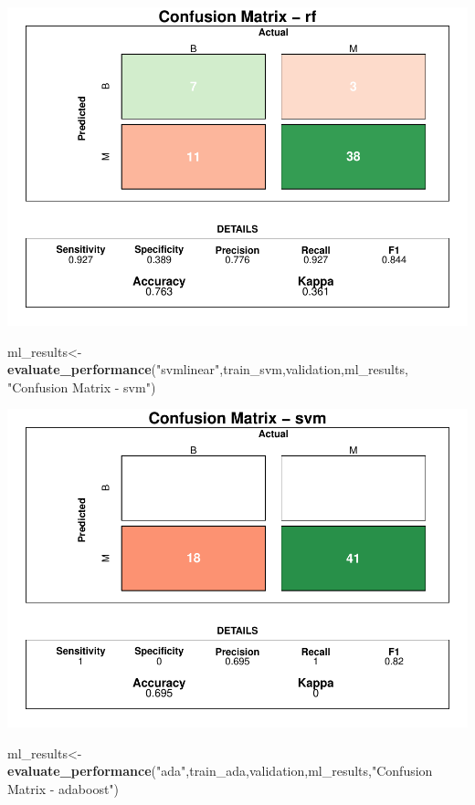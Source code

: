 \documentclass[]{article}
\newenvironment{Shaded}{\begin{snugshade}}{\end{snugshade}}
\newcommand{\KeywordTok}[1]{\textcolor[rgb]{0.13,0.29,0.53}{\textbf{#1}}}
\newcommand{\NormalTok}[1]{#1}
\newcommand{\StringTok}[1]{\textcolor[rgb]{0.31,0.60,0.02}{#1}}
\begin{document}
\includegraphics{LiverDisease_files/figure-latex/unnamed-chunk-45-1.pdf}

\begin{Shaded}
\begin{Highlighting}[]
\NormalTok{ml_results<-}\KeywordTok{evaluate_performance}\NormalTok{(}\StringTok{"svmlinear"}\NormalTok{,train_svm,validation,ml_results, }\StringTok{"Confusion Matrix - svm"}\NormalTok{)}
\end{Highlighting}
\end{Shaded}

\includegraphics{LiverDisease_files/figure-latex/unnamed-chunk-46-1.pdf}

\begin{Shaded}
\begin{Highlighting}[]
\NormalTok{ml_results<-}\KeywordTok{evaluate_performance}\NormalTok{(}\StringTok{"ada"}\NormalTok{,train_ada,validation,ml_results,}\StringTok{"Confusion Matrix - adaboost"}\NormalTok{)}
\end{Highlighting}
\end{Shaded}
\end{document}
